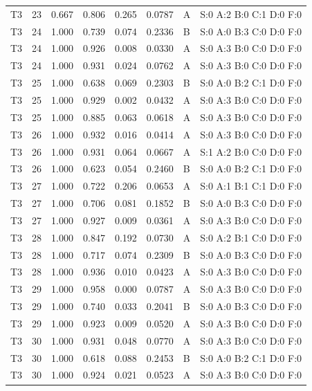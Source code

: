 \begin{longtable}{lrrrrrll}
T3 & 23 & 0.667 & 0.806 & 0.265 & 0.0787 & A & \tiny S:0 A:2 B:0 C:1 D:0 F:0 \\
T3 & 24 & 1.000 & 0.739 & 0.074 & 0.2336 & B & \tiny S:0 A:0 B:3 C:0 D:0 F:0 \\
T3 & 24 & 1.000 & 0.926 & 0.008 & 0.0330 & A & \tiny S:0 A:3 B:0 C:0 D:0 F:0 \\
T3 & 24 & 1.000 & 0.931 & 0.024 & 0.0762 & A & \tiny S:0 A:3 B:0 C:0 D:0 F:0 \\
T3 & 25 & 1.000 & 0.638 & 0.069 & 0.2303 & B & \tiny S:0 A:0 B:2 C:1 D:0 F:0 \\
T3 & 25 & 1.000 & 0.929 & 0.002 & 0.0432 & A & \tiny S:0 A:3 B:0 C:0 D:0 F:0 \\
T3 & 25 & 1.000 & 0.885 & 0.063 & 0.0618 & A & \tiny S:0 A:3 B:0 C:0 D:0 F:0 \\
T3 & 26 & 1.000 & 0.932 & 0.016 & 0.0414 & A & \tiny S:0 A:3 B:0 C:0 D:0 F:0 \\
T3 & 26 & 1.000 & 0.931 & 0.064 & 0.0667 & A & \tiny S:1 A:2 B:0 C:0 D:0 F:0 \\
T3 & 26 & 1.000 & 0.623 & 0.054 & 0.2460 & B & \tiny S:0 A:0 B:2 C:1 D:0 F:0 \\
T3 & 27 & 1.000 & 0.722 & 0.206 & 0.0653 & A & \tiny S:0 A:1 B:1 C:1 D:0 F:0 \\
T3 & 27 & 1.000 & 0.706 & 0.081 & 0.1852 & B & \tiny S:0 A:0 B:3 C:0 D:0 F:0 \\
T3 & 27 & 1.000 & 0.927 & 0.009 & 0.0361 & A & \tiny S:0 A:3 B:0 C:0 D:0 F:0 \\
T3 & 28 & 1.000 & 0.847 & 0.192 & 0.0730 & A & \tiny S:0 A:2 B:1 C:0 D:0 F:0 \\
T3 & 28 & 1.000 & 0.717 & 0.074 & 0.2309 & B & \tiny S:0 A:0 B:3 C:0 D:0 F:0 \\
T3 & 28 & 1.000 & 0.936 & 0.010 & 0.0423 & A & \tiny S:0 A:3 B:0 C:0 D:0 F:0 \\
T3 & 29 & 1.000 & 0.958 & 0.000 & 0.0787 & A & \tiny S:0 A:3 B:0 C:0 D:0 F:0 \\
T3 & 29 & 1.000 & 0.740 & 0.033 & 0.2041 & B & \tiny S:0 A:0 B:3 C:0 D:0 F:0 \\
T3 & 29 & 1.000 & 0.923 & 0.009 & 0.0520 & A & \tiny S:0 A:3 B:0 C:0 D:0 F:0 \\
T3 & 30 & 1.000 & 0.931 & 0.048 & 0.0770 & A & \tiny S:0 A:3 B:0 C:0 D:0 F:0 \\
T3 & 30 & 1.000 & 0.618 & 0.088 & 0.2453 & B & \tiny S:0 A:0 B:2 C:1 D:0 F:0 \\
T3 & 30 & 1.000 & 0.924 & 0.021 & 0.0523 & A & \tiny S:0 A:3 B:0 C:0 D:0 F:0 \\

\end{longtable}
